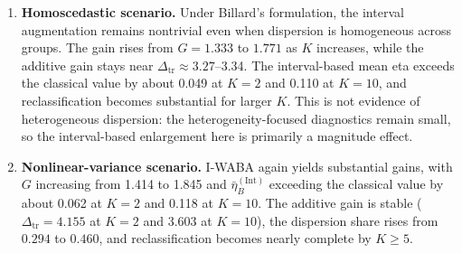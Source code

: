 \documentclass[preprint, times, 12pt, authoryear]{elsarticle}
\begin{document}
\begin{enumerate}
	\item \textbf{Homoscedastic scenario.} Under Billard's formulation, the interval augmentation remains nontrivial even when dispersion is homogeneous across groups. The gain rises from $G=1.333$ to $1.771$ as $K$ increases, while the additive gain stays near $\Delta_{\mathrm{tr}}\approx 3.27$--3.34. The interval-based mean eta exceeds the classical value by about 0.049 at $K=2$ and 0.110 at $K=10$, and reclassification becomes substantial for larger $K$. This is not evidence of heterogeneous dispersion: the heterogeneity-focused diagnostics remain small, so the interval-based enlargement here is primarily a magnitude effect.
	
	\item \textbf{Nonlinear-variance scenario.} I-WABA again yields substantial gains, with $G$ increasing from 1.414 to 1.845 and $\bar\eta_B^{(\mathrm{Int})}$ exceeding the classical value by about 0.062 at $K=2$ and 0.118 at $K=10$. The additive gain is stable ($\Delta_{\mathrm{tr}}=4.155$ at $K=2$ and $3.603$ at $K=10$), the dispersion share rises from $0.294$ to $0.460$, and reclassification becomes nearly complete by $K\ge 5$.
\end{enumerate}
\end{document}
